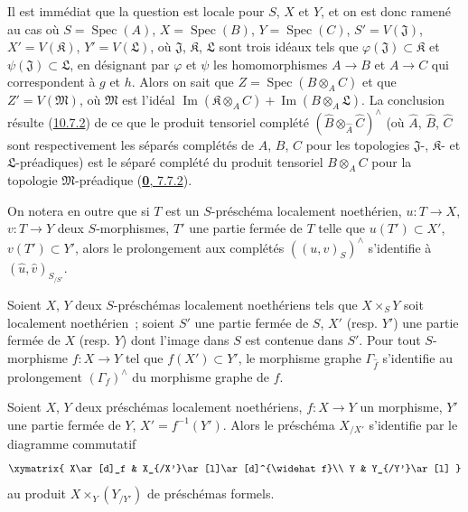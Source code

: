 Il est immédiat que la question est locale pour $S$, $X$ et $Y$, et on
est donc ramené au cas où $S=\operatorname{Spec}(A)$,
$X=\operatorname{Spec}(B)$, $Y=\operatorname{Spec}(C)$,
$S'=V(\mathfrak{J})$, $X'=V(\mathfrak{K})$, $Y'=V(\mathfrak{L})$, où
$\mathfrak{J}$, $\mathfrak{K}$, $\mathfrak{L}$ sont trois idéaux tels
que $\varphi(\mathfrak{J})\subset\mathfrak{K}$ et
$\psi(\mathfrak{J})\subset\mathfrak{L}$, en désignant par $\varphi$ et
$\psi$ les homomorphismes $A\to B$ et $A\to C$ qui correspondent à $g$
et $h$. Alors on sait que $Z=\operatorname{Spec}(B\otimes_A C)$ et que
$Z'=V(\mathfrak{M})$, où $\mathfrak{M}$ est l'idéal
$\operatorname{Im}(\mathfrak{K}\otimes_A C)
+\operatorname{Im}(B\otimes_A\mathfrak{L})$. La conclusion résulte
(\hyperref[I.10.7.2-fr]{10.7.2}) de ce que le produit tensoriel complété
$(\widehat B\otimes_{\widehat A}\widehat C)^\wedge$ (où $\widehat A$,
$\widehat B$, $\widehat C$ sont respectivement les séparés complétés de
$A$, $B$, $C$ pour les topologies $\mathfrak{J}$-, $\mathfrak{K}$- et
$\mathfrak{L}$-préadiques) est le séparé complété du produit tensoriel
$B\otimes_A C$ pour la topologie $\mathfrak{M}$-préadique
(\hyperref[0.7.7.2-fr]{\textbf{0}, 7.7.2}).

On notera en outre que si $T$ est un $S$-préschéma localement
noethérien, $u:T\to X$, $v:T\to Y$ deux $S$-morphismes, $T'$ une partie
fermée de $T$ telle que $u(T')\subset X'$, $v(T')\subset Y'$, alors le
prolongement aux complétés $((u,v)_S)^\wedge$ s'identifie à
$(\widehat u,\widehat v)_{S_{/S'}}$.

\begin{corollary}[10.9.8]
\label{I.10.9.8-fr}
Soient $X$, $Y$ deux $S$-préschémas localement noethériens tels que
$X\times_S Y$ soit localement noethérien~; soient $S'$ une partie fermée
de $S$, $X'$ \textup{(resp. $Y'$)} une partie fermée de $X$ \textup{(resp. $Y$)} dont
l'image dans $S$ est contenue dans $S'$. Pour tout $S$-morphisme
$f:X\to Y$ tel que $f(X')\subset Y'$, le morphisme graphe
$\Gamma_{\widehat f}$ s'identifie au prolongement $(\Gamma_f)^\wedge$ du
morphisme graphe de $f$.
\end{corollary}

\begin{corollary}[10.9.9]
\label{I.10.9.9-fr}
Soient $X$, $Y$ deux préschémas localement noethériens, $f:X\to Y$ un
morphisme, $Y'$ une partie fermée de $Y$, $X'=f^{-1}(Y')$. Alors le
préschéma $X_{/X'}$ s'identifie par le diagramme commutatif
\[
  \label{I.10.9.9.1-fr}
  \xymatrix{
    X\ar[d]_f &
    X_{/X'}\ar[l]\ar[d]^{\widehat f}\\
    Y &
    Y_{/Y'}\ar[l]
  }
\]
au produit $X\times_Y(Y_{/Y'})$ de préschémas formels.
\end{corollary}

